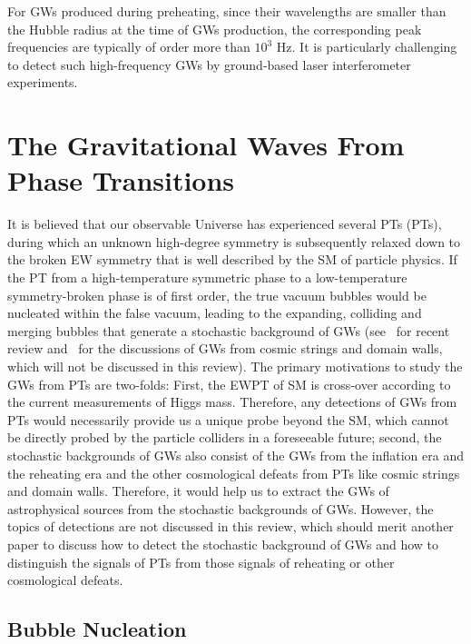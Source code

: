 \documentclass[a4paper,11pt]{article}
\begin{document}
For GWs produced during preheating, since their wavelengths are smaller than the Hubble radius at the time of GWs production, the corresponding peak frequencies are typically of order more than $10^3$ Hz. It is particularly challenging to detect such high-frequency GWs by ground-based laser interferometer experiments.


\section{The Gravitational Waves From Phase Transitions}
\label{sec:PT}

It is believed that our observable Universe has experienced several PTs (PTs), during which an unknown high-degree symmetry is subsequently relaxed down to the broken EW symmetry that is well described by the SM of particle physics. If the PT from a high-temperature symmetric phase to a low-temperature symmetry-broken phase is of first order, the true vacuum bubbles would be nucleated within the false vacuum, leading to the expanding, colliding and merging bubbles that generate a stochastic background of GWs (see~\cite{Caprini:2015zlo} for recent review and~\cite{Binetruy:2012ze} for the discussions of GWs from cosmic strings and domain walls, which will not be discussed in this review). The primary motivations to study the GWs from PTs are two-folds: First, the EWPT of SM is cross-over according to the current measurements of Higgs mass. Therefore, any detections of GWs from PTs would necessarily provide us a unique probe beyond the SM, which cannot be directly probed by the particle colliders in a foreseeable future; second, the stochastic backgrounds of GWs also consist of the GWs from the inflation era and the reheating era and the other cosmological defeats from PTs like cosmic strings and domain walls. Therefore, it would help us to extract the GWs of astrophysical sources from the stochastic backgrounds of GWs. However, the topics of detections are not discussed in this review, which should merit another paper to discuss how to detect the stochastic background of GWs and how to distinguish the signals of PTs from those signals of reheating or other cosmological defeats.

\subsection{Bubble Nucleation}
\label{subsec:bubble nucleation}
\end{document}
